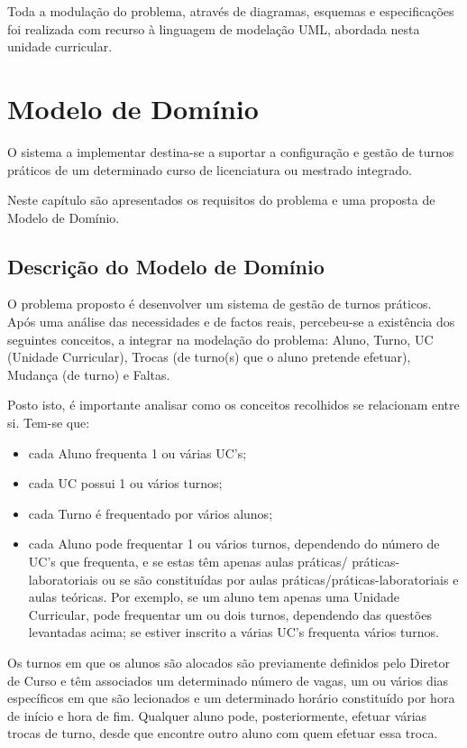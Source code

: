 \documentclass[12pt,a4paper]{report}
\begin{document}
Toda a modulação do problema, através de diagramas, esquemas e especificações foi realizada com recurso à linguagem de modelação UML, abordada nesta unidade curricular.



\chapter{Modelo de Domínio}
O sistema a implementar destina-se a suportar a configuração e gestão de turnos práticos de um determinado curso de licenciatura ou mestrado integrado.

Neste capítulo são apresentados os requisitos do problema e uma proposta de
Modelo de Domínio.
\section{Descrição do Modelo de Domínio}
O problema proposto é desenvolver um sistema de gestão de turnos práticos. Após uma análise das necessidades e de factos reais, percebeu-se a existência dos seguintes conceitos, a integrar na modelação do problema:  Aluno, Turno, UC (Unidade Curricular), Trocas (de turno(s) que o aluno
pretende efetuar), Mudança (de turno) e Faltas.

Posto isto, é importante analisar como os conceitos recolhidos se relacionam entre si. Tem-se que:
\begin{itemize}
   \item  cada Aluno frequenta 1 ou várias UC’s;
    \item cada UC possui 1 ou vários turnos;
    \item cada Turno é frequentado por vários alunos;
    \item cada Aluno pode frequentar 1 ou vários turnos, dependendo do número de UC’s que frequenta, e se estas têm apenas aulas práticas/ práticas-laboratoriais ou se são constituídas por aulas práticas/práticas-laboratoriais e aulas teóricas. Por exemplo, se um aluno tem apenas uma Unidade Curricular, pode frequentar um ou dois turnos, dependendo das questões levantadas acima; se estiver inscrito a várias UC’s frequenta vários turnos.
\end{itemize}


Os turnos em que os alunos são alocados são previamente definidos pelo Diretor de
Curso e têm associados um determinado número de vagas, um ou vários dias específicos em que são
lecionados e um determinado horário constituído por hora de início e hora de fim. Qualquer aluno pode, posteriormente, efetuar várias trocas de turno, desde que encontre outro aluno
com quem efetuar essa troca.
\end{document}
